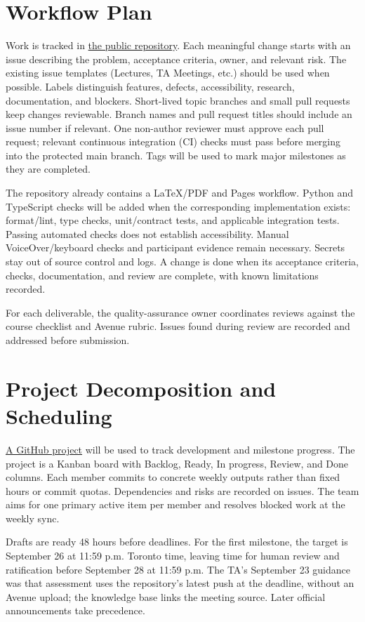 \documentclass[11pt]{article}
\begin{document}
\section{Workflow Plan}
Work is tracked in \href{https://github.com/NaturalControl/natural-control}{the public repository}.
Each meaningful change starts with an issue describing the problem, acceptance
criteria, owner, and relevant risk. The existing issue templates (Lectures, TA Meetings, etc.) should be used when possible.
Labels distinguish features, defects, accessibility, research, documentation, and blockers.
Short-lived topic branches and small pull requests keep changes reviewable. Branch names and pull request titles should
include an issue number if relevant. One non-author reviewer must approve each pull request; relevant
continuous integration (CI) checks must pass before merging into the protected main branch.
Tags will be used to mark major milestones as they are completed.

The repository already contains a LaTeX/PDF and Pages workflow. Python and
TypeScript checks will be added when the corresponding implementation exists:
format/lint, type checks, unit/contract tests, and applicable integration tests.
Passing automated checks does not establish accessibility. Manual VoiceOver/keyboard
checks and participant evidence remain necessary. Secrets stay out of source
control and logs. A change is done when its acceptance criteria, checks,
documentation, and review are complete, with known limitations recorded.

For each deliverable, the quality-assurance owner coordinates reviews against
the course checklist and Avenue rubric. Issues found during review are recorded
and addressed before submission.

\section{Project Decomposition and Scheduling}
\href{https://github.com/orgs/NaturalControl/projects/1/views/1}{A GitHub project} will be used to
track development and milestone progress. The project is a Kanban board with Backlog,
Ready, In progress, Review, and Done columns. Each member commits to concrete weekly
outputs rather than fixed hours or commit quotas. Dependencies and risks are recorded on issues.
The team aims for one primary active item per member and resolves blocked work at the weekly
sync.

Drafts are ready 48 hours before deadlines. For the first milestone, the target
is September 26 at 11:59 p.m. Toronto time, leaving time for human review and
ratification before September 28 at 11:59 p.m. The TA's September 23 guidance was
that assessment uses the repository's latest push at the deadline, without an
Avenue upload; the knowledge base links the meeting source. Later official
announcements take precedence.
\end{document}
